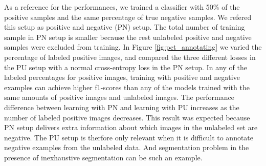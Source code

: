 \begin{table}[t]
\caption{Accuracy, mean precision, mean recall and mean f1-score on test set of the CIFAR dataset with true labels.The complete dataset contains images from CIFAR10 as the \textbf{positive} (P) set and images from CIFAR110 as the \textbf{negative} (N) set. The unlabeled positive examples from P set construct the \textbf{unlabeled} (U) set, together with N set. Precision and recall were averaged over ten positive classes. Experiments were repeated three times with random split of P set and U set, and standard deviations were around 0.01 if not explicitly mentioned.}
\label{tab:cifar}
\end{table}


\noindent
As a reference for the performances, we trained a classifier with 50\% of the positive samples and the same percentage of true negative samples.
We refered this setup as positive and negative (PN) setup.
The total number of training sample in PN setup is smaller because the rest unlabeled positive and negative samples were excluded from training.
In Figure \ref{fig:pct_annotating} we varied the percentage of labeled positive images, and compared the three different losses in the PU setup with a normal cross-entropy loss in the PN setup.
In any of the labeled percentages for positive images, training with positive and negative examples can achieve higher f1-scores than any of the models trained with the same amounts of positive images and unlabeled images.
The performance difference between learning with PN and learning with PU increases as the number of labeled positive images decreases.
This result was expected because PN setup delivers extra information about which images in the unlabeled set are negative.
The PU setup is therfore only relevant when it is difficult to annotate negative examples from the unlabeled data.
And segmentation problem in the presence of inexhaustive segmentation can be such an example.

